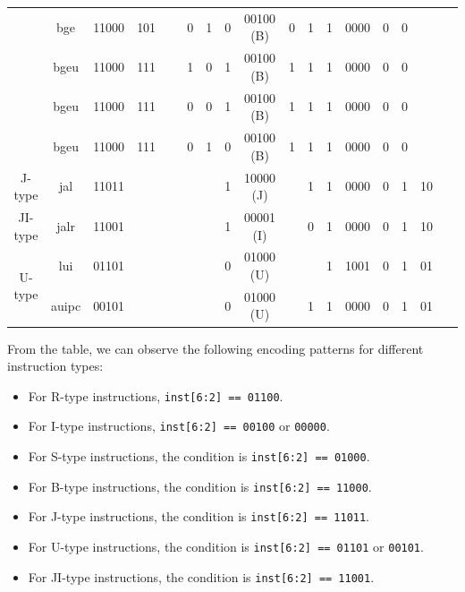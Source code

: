 \documentclass[12pt,a4paper,oneside]{book} %
\begin{document}
\begin{landscape}
\begin{table}[H]
{\begin{tabular}{|c|c|c|c|c|c|c|c|c|c|c|c|c|c|c|c|c|}
                             & bge    & 11000     & 101         & ~        & 0    & 1    & 0     & 00100 (B) & 0    & 1    & 1    & 0000   & 0     & 0      & ~     & ~       \\ \cline{2-17} 
                             & bgeu   & 11000     & 111         & ~        & 1    & 0    & 1     & 00100 (B) & 1    & 1    & 1    & 0000   & 0     & 0      & ~     & ~       \\ \cline{2-17} 
                             & bgeu   & 11000     & 111         & ~        & 0    & 0    & 1     & 00100 (B) & 1    & 1    & 1    & 0000   & 0     & 0      & ~     & ~       \\ \cline{2-17} 
                             & bgeu   & 11000     & 111         & ~        & 0    & 1    & 0     & 00100 (B) & 1    & 1    & 1    & 0000   & 0     & 0      & ~     & ~       \\ \hline
    J-type                   & jal    & 11011     & ~           & ~        & ~    & ~    & 1     & 10000 (J) & ~    & 1    & 1    & 0000   & 0     & 1      & 10    & ~       \\ \hline
    JI-type                  & jalr   & 11001     & ~           & ~        & ~    & ~    & 1     & 00001 (I) & ~    & 0    & 1    & 0000   & 0     & 1      & 10    & ~       \\ \hline
    \multirow{2}{*}{U-type}  & lui    & 01101     & ~           & ~        & ~    & ~    & 0     & 01000 (U) & ~    & ~    & 1    & 1001   & 0     & 1      & 01    & ~       \\ \cline{2-17} 
                             & auipc  & 00101     &             &          &      &      & 0     & 01000 (U) &      & 1    & 1    & 0000   & 0     & 1      & 01    &         \\ \hline
\end{tabular}
}
\end{table}

From the table, we can observe the following encoding patterns for different instruction types:
\begin{itemize}
    \item For R-type instructions, \texttt{inst[6:2] == 01100}.
    \item For I-type instructions, \texttt{inst[6:2] == 00100} or \texttt{00000}.
    \item For S-type instructions, the condition is \texttt{inst[6:2] == 01000}.
    \item For B-type instructions, the condition is \texttt{inst[6:2] == 11000}.
    \item For J-type instructions, the condition is \texttt{inst[6:2] == 11011}.
    \item For U-type instructions, the condition is \texttt{inst[6:2] == 01101} or \texttt{00101}.
    \item For JI-type instructions, the condition is \texttt{inst[6:2] == 11001}.
\end{itemize}
\end{landscape}
\end{document}
